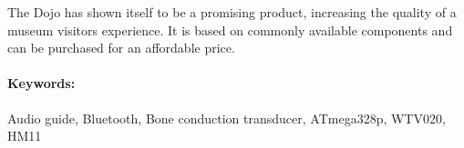 \documentclass[a4paper]{article}
\begin{document}
The Dojo has shown itself to be a promising product, increasing the quality of a museum visitors experience.
It is based on commonly available components and can be purchased for an affordable price.

\paragraph{Keywords:} Audio guide, Bluetooth, Bone conduction transducer, ATmega328p, WTV020, HM11
\end{document}
